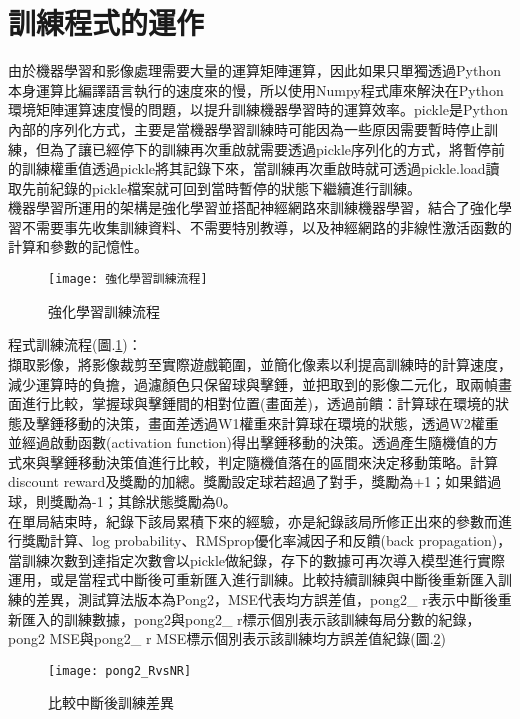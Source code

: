 \section{訓練程式的運作}
 由於機器學習和影像處理需要大量的運算矩陣運算，因此如果只單獨透過Python本身運算比編譯語言執行的速度來的慢，所以使用Numpy程式庫來解決在Python環境矩陣運算速度慢的問題，以提升訓練機器學習時的運算效率。pickle是Python內部的序列化方式，主要是當機器學習訓練時可能因為一些原因需要暫時停止訓練，但為了讓已經停下的訓練再次重啟就需要透過pickle序列化的方式，將暫停前的訓練權重值透過pickle將其記錄下來，當訓練再次重啟時就可透過pickle.load讀取先前紀錄的pickle檔案就可回到當時暫停的狀態下繼續進行訓練。\\
 
 機器學習所運用的架構是強化學習並搭配神經網路來訓練機器學習，結合了強化學習不需要事先收集訓練資料、不需要特別教導，以及神經網路的非線性激活函數的計算和參數的記憶性。\\

\begin{figure}[hbt!]
\begin{center}
\texttt{[image: 強化學習訓練流程]}
\caption{\Large 強化學習訓練流程}
\label{fig.強化學習程式流程}
\end{center}
\end{figure}

程式訓練流程(圖.\ref{fig.強化學習程式流程})：\\
 擷取影像，將影像裁剪至實際遊戲範圍，並簡化像素以利提高訓練時的計算速度，減少運算時的負擔，過濾顏色只保留球與擊錘，並把取到的影像二元化，取兩幀畫面進行比較，掌握球與擊錘間的相對位置(畫面差)，透過前饋：計算球在環境的狀態及擊錘移動的決策，畫面差透過W1權重來計算球在環境的狀態，透過W2權重並經過啟動函數(activation function)得出擊錘移動的決策。透過產生隨機值的方式來與擊錘移動決策值進行比較，判定隨機值落在的區間來決定移動策略。計算discount reward及獎勵的加總。獎勵設定球若超過了對手，獎勵為+1；如果錯過球，則獎勵為-1；其餘狀態獎勵為0。\\

 在單局結束時，紀錄下該局累積下來的經驗，亦是紀錄該局所修正出來的參數而進行獎勵計算、log probability、RMSprop優化率減因子和反饋(back propagation)，當訓練次數到達指定次數會以pickle做紀錄，存下的數據可再次導入模型進行實際運用，或是當程式中斷後可重新匯入進行訓練。比較持續訓練與中斷後重新匯入訓練的差異，測試算法版本為Pong2，MSE代表均方誤差值，pong2\_ r表示中斷後重新匯入的訓練數據，pong2與pong2\_ r標示個別表示該訓練每局分數的紀錄，pong2 MSE與pong2\_ r MSE標示個別表示該訓練均方誤差值紀錄(圖.\ref{fig.比較中斷數據}) \\
\begin{figure}[hbt!]
\begin{center}
\texttt{[image: pong2\_RvsNR]}
\caption{\Large 比較中斷後訓練差異}
\label{fig.比較中斷數據}
\end{center}
\end{figure}

